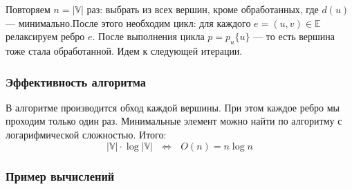\documentclass[russian]{lecture-notes}
\begin{document}
	Повторяем $n = |\mathbb{V}|$ раз: выбрать из всех вершин, кроме обработанных, где $d(u)$ --- минимально.После этого необходим цикл: для каждого $e = (u,v) \in \mathbb{E}$ релаксируем ребро $e$. После выполнения цикла $p = p_u\{u\}$ --- то есть вершина тоже стала обработанной. Идем к следующей итерации.
	
	\subsubsection{Эффективность алгоритма}
	В алгоритме производится обход каждой вершины. При этом каждое ребро мы проходим только один раз. Минимальные элемент можно найти по алгоритму с логарифмической сложностью. Итого:
	$$|\mathbb{V}| \cdot \log|\mathbb{V}|~~~\Leftrightarrow~~~O(n) = n \log n$$
	
	\subsubsection{Пример вычислений}
\end{document}
